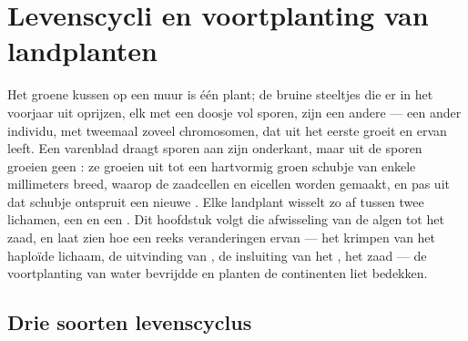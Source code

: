\chapter{Levenscycli en voortplanting van landplanten}\label{ch:b2:plant-life-cycles}

Het groene kussen  op een muur is één plant; de bruine steeltjes die
er in het voorjaar uit oprijzen, elk met een doosje vol sporen, zijn een
andere --- een ander individu, met tweemaal zoveel chromosomen, dat uit
het eerste groeit en ervan leeft. Een varenblad draagt sporen aan zijn
onderkant, maar uit de sporen groeien geen : ze groeien uit tot
een hartvormig groen schubje van enkele millimeters breed, waarop de
zaadcellen en eicellen worden gemaakt, en pas uit dat schubje ontspruit
een nieuwe . Elke landplant wisselt zo af tussen twee lichamen, een
 en een . Dit hoofdstuk volgt die afwisseling van de algen
tot het zaad, en laat zien hoe een reeks veranderingen ervan --- het
krimpen van het haploïde lichaam, de uitvinding van , de
insluiting van het , het zaad --- de voortplanting van water
bevrijdde en planten de continenten liet bedekken.

\section{Drie soorten levenscyclus}

